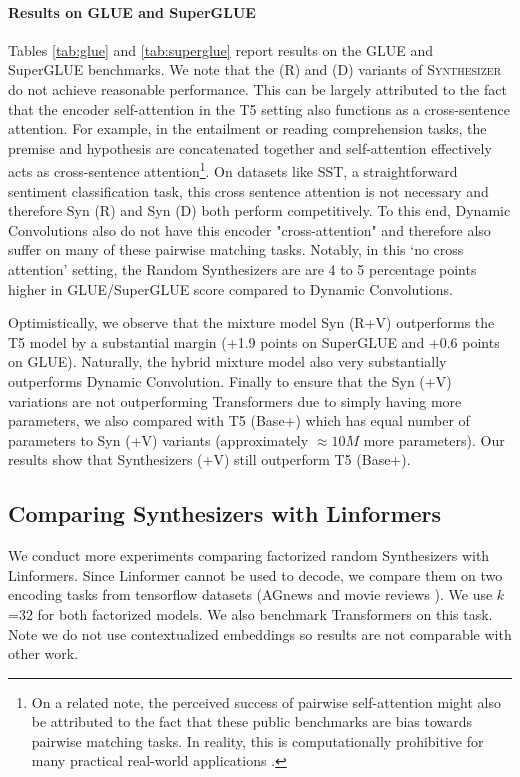 \paragraph{Results on GLUE and SuperGLUE} Tables \ref{tab:glue} and \ref{tab:superglue} report results on the GLUE and SuperGLUE benchmarks. We note that the (R) and (D) variants of \textsc{Synthesizer} do not achieve reasonable performance. This can be largely attributed to the fact that the encoder self-attention in the T5 setting also functions as a cross-sentence attention. For example, in the entailment or reading comprehension tasks, the premise and hypothesis are concatenated together and self-attention effectively acts as cross-sentence attention\footnote{On a related note, the perceived success of pairwise self-attention might also be attributed to the fact that these public benchmarks are bias towards pairwise matching tasks. In reality, this is computationally prohibitive for many practical real-world applications \citep{seo2018phrase}. }. On datasets like SST, a straightforward sentiment classification task, this cross sentence attention is not necessary and therefore Syn (R) and Syn (D) both perform competitively. To this end, Dynamic Convolutions \citep{wu2019pay} also do not have this encoder "cross-attention" and therefore also suffer on many of these pairwise matching tasks. Notably, in this `no cross attention' setting, the Random Synthesizers are are 4 to 5 percentage points higher in GLUE/SuperGLUE score compared to Dynamic Convolutions.

Optimistically, we observe that the mixture model Syn (R+V) outperforms the T5 model by a substantial margin (+1.9 points on SuperGLUE and +0.6 points on GLUE). Naturally, the hybrid mixture model also very substantially outperforms Dynamic Convolution. Finally to ensure that the Syn (+V) variations are not outperforming Transformers due to simply having more parameters, we also compared with T5 (Base+) which has equal number of parameters to Syn (+V) variants (approximately $\approx 10M$ more parameters). Our results show that Synthesizers (+V) still outperform T5 (Base+).

\subsection{Comparing Synthesizers with Linformers} We conduct more experiments comparing factorized random Synthesizers with Linformers. Since Linformer cannot be used to decode, we compare them on two encoding tasks from tensorflow datasets (AGnews \citep{zhang2015character} and movie reviews \citep{maas-EtAl:2011:ACL-HLT2011}). We use $k$=$32$ for both factorized models. We also benchmark Transformers on this task. Note we do not use contextualized embeddings so results are not comparable with other work. 

